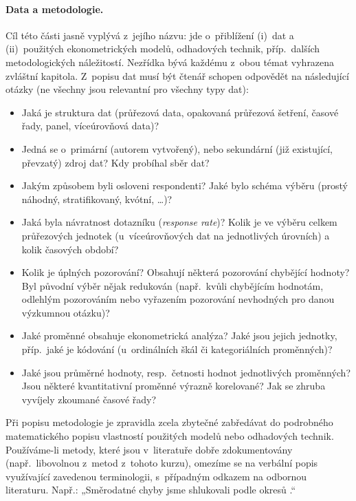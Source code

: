 \documentclass[11pt,a4paper]{article}
\begin{document}
\paragraph{Data a metodologie.} Cíl této části jasně vyplývá z~jejího názvu: jde o~přiblížení (i)~dat a (ii)~použitých ekonometrických modelů, odhadových technik, příp.\ dalších metodologických náležitostí. Nezřídka bývá každému z~obou témat vyhrazena zvláštní kapitola. Z~popisu dat musí být čtenář schopen odpovědět na následující otázky (ne všechny jsou relevantní pro všechny typy dat):
\begin{itemize}[itemsep=1pt, topsep=2pt]
  \item Jaká je struktura dat (průřezová data, opakovaná průřezová šetření, časové řady, panel, víceúrovňová data)?
  \item Jedná se o~primární (autorem vytvořený), nebo sekundární (již existující, převzatý) zdroj dat? Kdy probíhal sběr dat?
  \item Jakým způsobem byli osloveni respondenti? Jaké bylo schéma výběru (prostý náhodný, stratifikovaný, kvótní, \ldots)?
  \item Jaká byla návratnost dotazníku (\textit{response rate})? Kolik je ve výběru celkem průřezových jednotek (u~víceúrovňových dat na jednotlivých úrovních) a kolik časových období?
  \item Kolik je úplných pozorování? Obsahují některá pozorování chybějící hodnoty? Byl původní výběr nějak redukován (např.\ kvůli chybějícím hodnotám, odlehlým pozorováním nebo vyřazením pozorování nevhodných pro danou výzkumnou otázku)?
  \item Jaké proměnné obsahuje ekonometrická analýza? Jaké jsou jejich jednotky, příp.\ jaké je kódování (u~ordinálních škál či kategoriálních proměnných)?
  \item Jaké jsou průměrné hodnoty, resp.\ četnosti hodnot jednotlivých proměnných? Jsou některé kvantitativní proměnné výrazně korelované? Jak se zhruba vyvíjely zkoumané časové řady?
\end{itemize}

Při popisu metodologie je zpravidla zcela zbytečné zabředávat do podrobného matematického popisu vlastností použitých modelů nebo odhadových technik. Používáme-li metody, které jsou v~literatuře dobře zdokumentovány (např.\ libovolnou z~metod z~tohoto kurzu), omezíme se na verbální popis využívající zavedenou terminologii, s~případným odkazem na odbornou literaturu. Např.: „Směrodatné chyby jsme shlukovali podle okresů \citep[viz např.][kap.~8]{Angrist2009}.“
\end{document}
